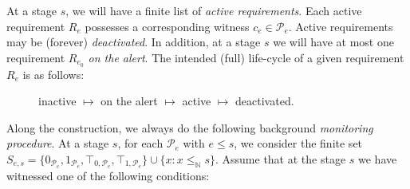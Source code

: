 \documentclass[a4paper,UKenglish,cleveref, autoref, thm-restate]{lipics-v2021}
\begin{document}
At a stage $s$, we will have a finite list of \emph{active requirements}. Each active requirement $R_e$ possesses a corresponding witness $c_e \in \mathcal{P}_e$. Active requirements may be (forever) \emph{deactivated}. In addition, at a stage $s$ we will have at most one requirement $R_{e_0}$ \emph{on the alert}. 
The intended (full) life-cycle of a given requirement $R_e$ is as follows:
\begin{description}
\item[] inactive $\mapsto$ on the alert $\mapsto$ active $\mapsto$ deactivated.
\end{description}



Along the construction, we always do the following background \emph{monitoring procedure}. At a stage $s$, for each $\mathcal{P}_e$ with $e\leq s$, we consider the finite set 
$
	S_{e,s} = \{ 0_{\mathcal{P}_e}, 1_{\mathcal{P}_e}, \top_{0,\mathcal{P}_e}, \top_{1,\mathcal{P}_e}\} \cup \{ x : x\leq_{\mathbb{N}} s\}.
$ 
Assume that at the stage $s$ we have witnessed one of the following conditions:
\end{document}
